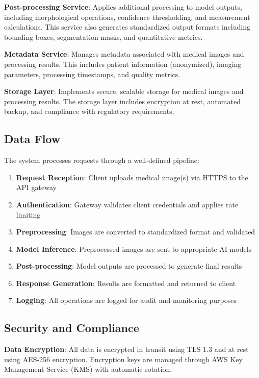 \documentclass[12pt,a4paper]{article}
\begin{document}
\textbf{Post-processing Service}: Applies additional processing to model outputs, including morphological operations, confidence thresholding, and measurement calculations. This service also generates standardized output formats including bounding boxes, segmentation masks, and quantitative metrics.

\textbf{Metadata Service}: Manages metadata associated with medical images and processing results. This includes patient information (anonymized), imaging parameters, processing timestamps, and quality metrics.

\textbf{Storage Layer}: Implements secure, scalable storage for medical images and processing results. The storage layer includes encryption at rest, automated backup, and compliance with regulatory requirements.

\subsection{Data Flow}

The system processes requests through a well-defined pipeline:

\begin{enumerate}
    \item \textbf{Request Reception}: Client uploads medical image(s) via HTTPS to the API gateway
    \item \textbf{Authentication}: Gateway validates client credentials and applies rate limiting
    \item \textbf{Preprocessing}: Images are converted to standardized format and validated
    \item \textbf{Model Inference}: Preprocessed images are sent to appropriate AI models
    \item \textbf{Post-processing}: Model outputs are processed to generate final results
    \item \textbf{Response Generation}: Results are formatted and returned to client
    \item \textbf{Logging}: All operations are logged for audit and monitoring purposes
\end{enumerate}

\subsection{Security and Compliance}

\textbf{Data Encryption}: All data is encrypted in transit using TLS 1.3 and at rest using AES-256 encryption. Encryption keys are managed through AWS Key Management Service (KMS) with automatic rotation.
\end{document}
